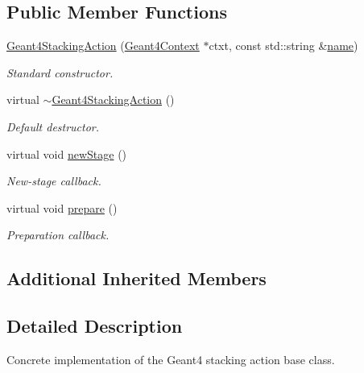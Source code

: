 \subsection*{Public Member Functions}
\begin{DoxyCompactItemize}
\item 
\hyperlink{class_d_d4hep_1_1_simulation_1_1_geant4_stacking_action_aecdcf9e00ad164f12b6db14e61aa2693}{Geant4\+Stacking\+Action} (\hyperlink{class_d_d4hep_1_1_simulation_1_1_geant4_context}{Geant4\+Context} $\ast$ctxt, const std\+::string \&\hyperlink{class_d_d4hep_1_1_simulation_1_1_geant4_action_af374e70b014d16afb81dd9d77cc3894b}{name})
\begin{DoxyCompactList}\small\item\em Standard constructor. \end{DoxyCompactList}\item 
virtual \hyperlink{class_d_d4hep_1_1_simulation_1_1_geant4_stacking_action_a15dd317e760306d51e728b26aebf65a7}{$\sim$\+Geant4\+Stacking\+Action} ()
\begin{DoxyCompactList}\small\item\em Default destructor. \end{DoxyCompactList}\item 
virtual void \hyperlink{class_d_d4hep_1_1_simulation_1_1_geant4_stacking_action_a2709ba86b13b0574dcd1d8e580209d0b}{new\+Stage} ()
\begin{DoxyCompactList}\small\item\em New-\/stage callback. \end{DoxyCompactList}\item 
virtual void \hyperlink{class_d_d4hep_1_1_simulation_1_1_geant4_stacking_action_a3974c0e7b737bdccced8c196fc316b5b}{prepare} ()
\begin{DoxyCompactList}\small\item\em Preparation callback. \end{DoxyCompactList}\end{DoxyCompactItemize}
\subsection*{Additional Inherited Members}


\subsection{Detailed Description}
Concrete implementation of the Geant4 stacking action base class. 

